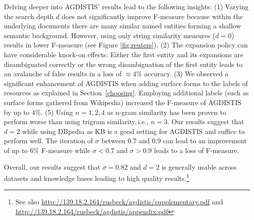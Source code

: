 Delving deeper into AGDISTIS' results lead to the following insights:
(1) Varying the search depth $d$ does not significantly improve \mbox{F-measure} because within the underlying documents there are many similar named entities forming a shallow semantic background. However, using only string similarity measures ($d=0$) results in lower F-measure (see Figure \ref{fig:reuters}). %
(2) The expansion policy can have considerable knock-on effects: Either the first entity and its expansions are disambiguated correctly or the wrong disambiguation of the first entity leads to an avalanche of false results in a loss of $\approx 4\%$ accuracy.
(3) We observed a significant enhancement of AGDISTIS when adding surface forms to the labels of resources as explained in Section~\ref{choosing}.
Employing additional labels (such as surface forms gathered from Wikipedia) increased the \mbox{F-measure} of AGDISTIS by up to $4\%$. 
(5) Using $n=1,2,4$ as n-gram similarity has been proven to perform worse than using trigram similarity,\,i.e., $n=3$.
Our results suggest that $d=2$ while using DBpedia as \ac{KB} is a good setting for AGDISTIS and suffice to perform well. 
The iteration of $\sigma$ between $0.7$ and $0.9$ can lead to an improvement of up to $6\%$ \mbox{F-measure} while $\sigma<0.7$ and $\sigma>0.9$ leads to a loss of F-measure.

Overall, our results suggest that $\sigma=0.82$ and $d=2$ is generally usable across datasets and knowledge bases leading to high quality results.\footnote{See also \url{http://139.18.2.164/rusbeck/agdistis/supplementary.pdf} and \url{http://139.18.2.164/rusbeck/agdistis/appendix.pdf}}


